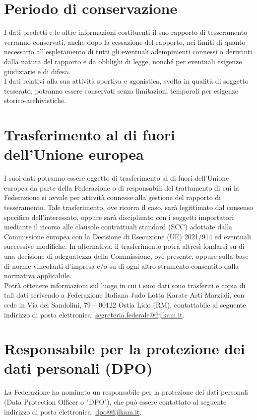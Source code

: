 \documentclass[
	twocolumn
]{djts}
\begin{document}
	\section{Periodo di conservazione}
	I dati predetti e le altre informazioni costituenti il suo rapporto di tesseramento verranno conservati, anche dopo la cessazione del rapporto, nei limiti di quanto necessario all'espletamento di tutti gli eventuali adempimenti connessi o derivanti dalla natura del rapporto e da obblighi di legge, nonché per eventuali esigenze giudiziarie e di difesa. \\
	I dati relativi alla sua attività sportiva e agonistica, svolta in qualità di soggetto tesserato, potranno essere conservati senza limitazioni temporali per esigenze storico-archivistiche.
	
	\section{Trasferimento al di fuori dell'Unione europea}
	I suoi dati potranno essere oggetto di trasferimento al di fuori dell'Unione europea da parte della Federazione o di responsabili del trattamento di cui la Federazione si avvale per attività connesse alla gestione del rapporto di tesseramento. Tale trasferimento, ove ricorra il caso, sarà legittimato dal consenso specifico dell'interessato, oppure sarà disciplinato con i soggetti importatori mediante il ricorso alle clausole contrattuali standard (SCC) adottate dalla Commissione europea con la Decisione di Esecuzione (UE) 2021/914 ed eventuali successive modifiche. In alternativa, il trasferimento potrà altresì fondarsi su di una decisione di adeguatezza della Commissione, ove presente, oppure sulla base di norme vincolanti d'impresa e/o su di ogni altro strumento consentito dalla normativa applicabile. \\
	Potrà ottenere informazioni sul luogo in cui i suoi dati sono trasferiti e copia di tali dati scrivendo a Federazione Italiana Judo Lotta Karate Arti Marziali, con sede in Via dei Sandolini, 79 – 00122 Ostia Lido (RM), contattabile al seguente indirizzo di posta elettronica: \href{mailto:segreteria.federale@fijlkam.it}{segreteria.federale@fijlkam.it}.
	
	\section*{Responsabile per la protezione dei dati personali (DPO)}
	La Federazione ha nominato un responsabile per la protezione dei dati personali (Data Protection Officer o
	"DPO"), che può essere contattato al seguente indirizzo di posta elettronica: \href{mailto:dpo@fijlkam.it}{dpo@fijlkam.it}.
	
\end{document}
